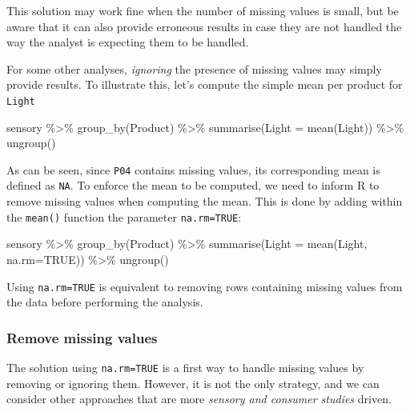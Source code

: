 \documentclass[
]{book}
\newenvironment{Shaded}{\begin{snugshade}}{\end{snugshade}}
\newcommand{\AttributeTok}[1]{\textcolor[rgb]{0.77,0.63,0.00}{#1}}
\newcommand{\ConstantTok}[1]{\textcolor[rgb]{0.00,0.00,0.00}{#1}}
\newcommand{\FunctionTok}[1]{\textcolor[rgb]{0.00,0.00,0.00}{#1}}
\newcommand{\NormalTok}[1]{#1}
\newcommand{\SpecialCharTok}[1]{\textcolor[rgb]{0.00,0.00,0.00}{#1}}
\begin{document}
This solution may work fine when the number of missing values is small, but be aware that it can also provide erroneous results in case they are not handled the way the analyst is expecting them to be handled.

For some other analyses, \emph{ignoring} the presence of missing values may simply provide results. To illustrate this, let's compute the simple mean per product for \texttt{Light}

\begin{Shaded}
\begin{Highlighting}[]
\NormalTok{sensory }\SpecialCharTok{\%\textgreater{}\%} 
  \FunctionTok{group\_by}\NormalTok{(Product) }\SpecialCharTok{\%\textgreater{}\%} 
  \FunctionTok{summarise}\NormalTok{(}\AttributeTok{Light =} \FunctionTok{mean}\NormalTok{(Light)) }\SpecialCharTok{\%\textgreater{}\%} 
  \FunctionTok{ungroup}\NormalTok{()}
\end{Highlighting}
\end{Shaded}

As can be seen, since \texttt{P04} contains missing values, its corresponding mean is defined as \texttt{NA}. To enforce the mean to be computed, we need to inform R to remove missing values when computing the mean. This is done by adding within the \texttt{mean()} function the parameter \texttt{na.rm=TRUE}:

\begin{Shaded}
\begin{Highlighting}[]
\NormalTok{sensory }\SpecialCharTok{\%\textgreater{}\%} 
  \FunctionTok{group\_by}\NormalTok{(Product) }\SpecialCharTok{\%\textgreater{}\%} 
  \FunctionTok{summarise}\NormalTok{(}\AttributeTok{Light =} \FunctionTok{mean}\NormalTok{(Light, }\AttributeTok{na.rm=}\ConstantTok{TRUE}\NormalTok{)) }\SpecialCharTok{\%\textgreater{}\%} 
  \FunctionTok{ungroup}\NormalTok{()}
\end{Highlighting}
\end{Shaded}

Using \texttt{na.rm=TRUE} is equivalent to removing rows containing missing values from the data before performing the analysis.

\hypertarget{remove-missing-values}{%
\subsubsection{Remove missing values}\label{remove-missing-values}}

The solution using \texttt{na.rm=TRUE} is a first way to handle missing values by removing or ignoring them. However, it is not the only strategy, and we can consider other approaches that are more \emph{sensory and consumer studies} driven.
\end{document}
